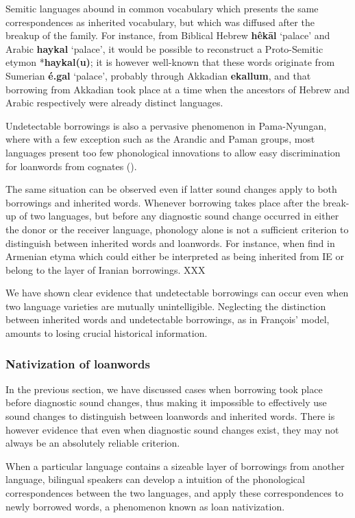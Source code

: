 \documentclass[oneside,a4paper,11pt]{article}
\newcommand{\ipa}[1]{\textbf{{\phon\mbox{#1}}}} %
\begin{document}
Semitic languages abound in common vocabulary which presents the same correspondences as inherited vocabulary, but which was diffused after the breakup of the family. For instance, from Biblical Hebrew \ipa{hêkāl} `palace' and Arabic \ipa{haykal} `palace', it would be possible to reconstruct a Proto-Semitic etymon *\ipa{haykal(u)}; it is however well-known that these words originate from Sumerian \ipa{é.gal} `palace', probably through Akkadian \ipa{ekallum}, and that borrowing from Akkadian took place at a time when the ancestors of Hebrew and Arabic respectively were already distinct languages.

Undetectable borrowings is also a pervasive phenomenon in Pama-Nyungan, where with a few exception such as the Arandic and Paman groups, most languages present too few phonological innovations to allow easy discrimination for loanwords from cognates (\citealt[46]{koch04method}).

The same situation can be observed even if latter sound changes apply to both borrowings and inherited words. Whenever borrowing takes place after the break-up of two languages, but before any diagnostic sound change occurred in either the donor or the receiver language, phonology alone is not a sufficient criterion to distinguish between inherited words and loanwords. For instance, when find in Armenian etyma which could either be interpreted as being inherited from IE or belong to the layer of Iranian borrowings. XXX

 We have shown clear evidence that undetectable borrowings can occur even when two language varieties are mutually unintelligible. Neglecting the distinction between inherited words and undetectable borrowings, as in François' model, amounts to losing crucial historical information.

\subsubsection{Nativization of loanwords}
In the previous section, we have discussed cases when borrowing took place before diagnostic sound changes, thus making it impossible to effectively use sound changes to distinguish between loanwords and inherited words. There is however evidence that even when diagnostic sound changes exist, they may not always be an absolutely reliable criterion.

When a particular language contains a sizeable layer of borrowings from another language, bilingual speakers can develop a intuition of the phonological correspondences between the two languages, and apply these correspondences to newly borrowed words, a phenomenon known as loan nativization.
\end{document}
